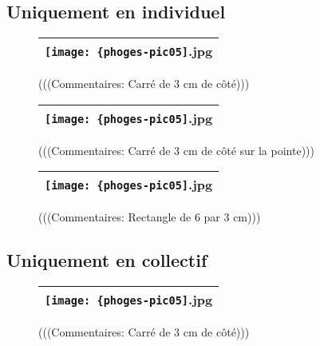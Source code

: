 \documentclass[12pt,twocolumn,french]{article}
\begin{document}
\subsection{Uniquement en individuel}
%
  \begin{figure}[H]
    \caption{
      (((Commentaires: Carré de 3 cm de côté)))
    }
    \vspace{4mm}
    \label{phoges-pic05.jpg}
    \noindent \centering{}
    \begin{tabular}{|c|}
      \hline
          \texttt{[image: \{phoges-pic05]}.jpg}
        \tabularnewline \hline
    \end{tabular}
  \end{figure}
  \begin{figure}[H]
    \caption{
      (((Commentaires: Carré de 3 cm de côté sur la pointe)))
    }
    \vspace{4mm}
    \label{phoges-pic05.jpg}
    \noindent \centering{}
    \begin{tabular}{|c|}
      \hline
          \texttt{[image: \{phoges-pic05]}.jpg}
        \tabularnewline \hline
    \end{tabular}
  \end{figure}
  \begin{figure}[H]
    \caption{
      (((Commentaires: Rectangle de 6 par 3 cm)))
    }
    \vspace{4mm}
    \label{phoges-pic05.jpg}
    \noindent \centering{}
    \begin{tabular}{|c|}
      \hline
          \texttt{[image: \{phoges-pic05]}.jpg}
        \tabularnewline \hline
    \end{tabular}
  \end{figure}
%
\subsection{Uniquement en collectif}
%

  \begin{figure}[H]
    \caption{
      (((Commentaires: Carré de 3 cm de côté)))
    }
    \vspace{4mm}
    \label{phoges-pic05.jpg}
    \noindent \centering{}
    \begin{tabular}{|c|}
      \hline
          \texttt{[image: \{phoges-pic05]}.jpg}
        \tabularnewline \hline
    \end{tabular}
  \end{figure}
\end{document}
